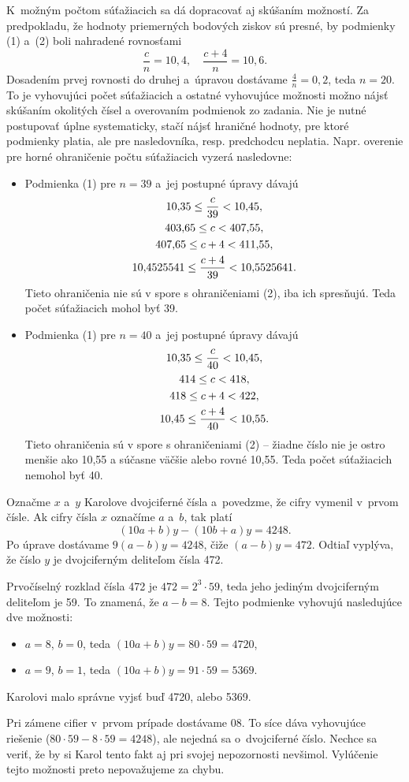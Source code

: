 {
K~možným počtom súťažiacich sa dá dopracovať aj skúšaním možností.
Za predpokladu, že hodnoty priemerných bodových ziskov sú presné, by podmienky (1) a~(2) boli nahradené rovnosťami
$$
\frac{c}n=10{,}4,\quad
\frac{c+4}n=10{,}6.
$$
Dosadením prvej rovnosti do druhej a~úpravou dostávame
$\frac4n =0{,}2$, teda $n=20$.
To je vyhovujúci počet súťažiacich a ostatné vyhovujúce možnosti možno nájsť skúšaním okolitých čísel a overovaním podmienok zo zadania.
Nie je nutné postupovať úplne systematicky, stačí nájsť hraničné hodnoty, pre ktoré podmienky platia, ale pre nasledovníka, resp. predchodcu neplatia.
Napr. overenie pre horné ohraničenie počtu súťažiacich vyzerá nasledovne:
\begin{itemize}
\item Podmienka (1) pre $n=39$ a~jej postupné úpravy dávajú
$$
\gathered
10{,}35 \le \frac{c}{39} < 10{,}45 , \\
403{,}65 \le c < 407{,}55 , \\
407{,}65 \le c+4 < 411{,}55 , \\
10{,}4525541 \le \frac{c+4}{39} < 10{,}5525641 .
\endgathered
$$
Tieto ohraničenia nie sú v spore s ohraničeniami (2), iba ich spresňujú.
Teda počet súťažiacich mohol byť 39.
\item Podmienka (1) pre $n=40$ a~jej postupné úpravy dávajú
$$
\gathered
10{,}35 \le \frac{c}{40} < 10{,}45 , \\
414 \le c < 418 , \\
418 \le c+4 < 422 , \\
10{,}45 \le \frac{c+4}{40} < 10{,}55 .
\endgathered
$$
Tieto ohraničenia sú v spore s ohraničeniami (2) -- žiadne číslo nie je ostro menšie ako 10,55 a súčasne väčšie alebo rovné 10,55.
Teda počet súťažiacich nemohol byť 40.
\end{itemize}
}

{%
Označme $x$ a~$y$ Karolove dvojciferné čísla a~povedzme, že cifry vymenil v~prvom čísle.
Ak cifry čísla $x$ označíme $a$ a~$b$, tak platí
$$
(10a+b)y-(10b+a)y=4248.
$$
Po úprave dostávame $9(a-b)y=4248$, čiže $(a-b)y=472$.
Odtiaľ vyplýva, že číslo $y$ je dvojciferným deliteľom čísla 472.

Prvočíselný rozklad čísla 472 je $472=2^3\cdot59$, teda jeho jediným dvojciferným deliteľom je 59.
To znamená, že $a-b=8$.
Tejto podmienke vyhovujú nasledujúce dve možnosti:
\begin{itemize}
\item $a=8$, $b=0$, teda $(10a+b)y =80\cdot59 =4720$,
\item $a=9$, $b=1$, teda $(10a+b)y =91\cdot59 =5369$.
\end{itemize}

Karolovi malo správne vyjsť buď 4720, alebo 5369.

\poznamka
Pri zámene cifier v~prvom prípade dostávame 08.
To síce dáva vyhovujúce riešenie ($80\cdot59-8\cdot59=4248$), ale nejedná sa o~dvojciferné číslo.
Nechce sa veriť, že by si Karol tento fakt aj pri svojej nepozornosti nevšimol.
Vylúčenie tejto možnosti preto nepovažujeme za chybu.
}

